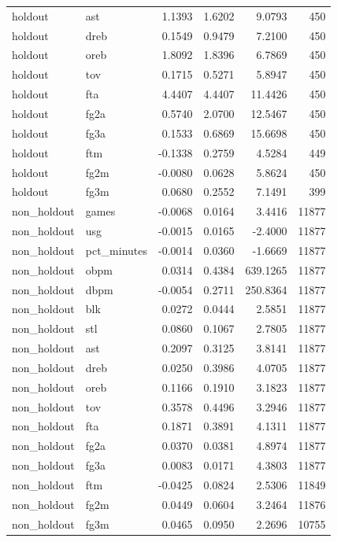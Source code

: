 \begin{table}
\begin{tabular}{llrrrr}
holdout & ast & 1.1393 & 1.6202 & 9.0793 & 450 \\
holdout & dreb & 0.1549 & 0.9479 & 7.2100 & 450 \\
holdout & oreb & 1.8092 & 1.8396 & 6.7869 & 450 \\
holdout & tov & 0.1715 & 0.5271 & 5.8947 & 450 \\
holdout & fta & 4.4407 & 4.4407 & 11.4426 & 450 \\
holdout & fg2a & 0.5740 & 2.0700 & 12.5467 & 450 \\
holdout & fg3a & 0.1533 & 0.6869 & 15.6698 & 450 \\
holdout & ftm & -0.1338 & 0.2759 & 4.5284 & 449 \\
holdout & fg2m & -0.0080 & 0.0628 & 5.8624 & 450 \\
holdout & fg3m & 0.0680 & 0.2552 & 7.1491 & 399 \\
non\_holdout & games & -0.0068 & 0.0164 & 3.4416 & 11877 \\
non\_holdout & usg & -0.0015 & 0.0165 & -2.4000 & 11877 \\
non\_holdout & pct\_minutes & -0.0014 & 0.0360 & -1.6669 & 11877 \\
non\_holdout & obpm & 0.0314 & 0.4384 & 639.1265 & 11877 \\
non\_holdout & dbpm & -0.0054 & 0.2711 & 250.8364 & 11877 \\
non\_holdout & blk & 0.0272 & 0.0444 & 2.5851 & 11877 \\
non\_holdout & stl & 0.0860 & 0.1067 & 2.7805 & 11877 \\
non\_holdout & ast & 0.2097 & 0.3125 & 3.8141 & 11877 \\
non\_holdout & dreb & 0.0250 & 0.3986 & 4.0705 & 11877 \\
non\_holdout & oreb & 0.1166 & 0.1910 & 3.1823 & 11877 \\
non\_holdout & tov & 0.3578 & 0.4496 & 3.2946 & 11877 \\
non\_holdout & fta & 0.1871 & 0.3891 & 4.1311 & 11877 \\
non\_holdout & fg2a & 0.0370 & 0.0381 & 4.8974 & 11877 \\
non\_holdout & fg3a & 0.0083 & 0.0171 & 4.3803 & 11877 \\
non\_holdout & ftm & -0.0425 & 0.0824 & 2.5306 & 11849 \\
non\_holdout & fg2m & 0.0449 & 0.0604 & 3.2464 & 11876 \\
non\_holdout & fg3m & 0.0465 & 0.0950 & 2.2696 & 10755 \\
\bottomrule
\end{tabular}
\end{table}
